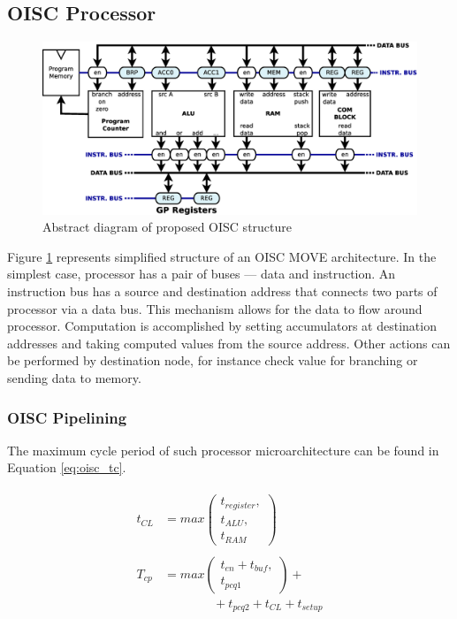 \subsection{OISC Processor}

\begin{figure}[t!]
	\centering
	\includegraphics[width=\linewidth]{../resources/oisc.eps}
	\caption{Abstract diagram of proposed OISC structure}
	\label{fig:oisc_simple}
\end{figure}

Figure \ref{fig:oisc_simple} represents simplified structure of an OISC MOVE architecture. In the simplest case, processor has a pair of buses — data and instruction. An instruction bus has a source and destination address that connects two parts of processor via a data bus. This mechanism allows for the data to flow around processor. Computation is accomplished by setting accumulators at destination addresses and taking computed values from the source address. Other actions can be performed by destination node, for instance check value for branching or sending data to memory. 

\subsubsection{OISC Pipelining}
The maximum cycle period of such processor microarchitecture can be found in Equation \ref{eq:oisc_tc}. 

\begin{multline}\label{eq:oisc_tc}
	\begin{split}
t_{CL} &= max \left( \begin{matrix}
t_{register},\\
t_{ALU},\\
t_{RAM}\end{matrix}\right)\\
&\\
T_{cp} &= max \left( \begin{matrix}
t_{en} + t_{buf},\\
t_{pcq1}\end{matrix}\right) +\\
&\qquad\qquad+ t_{pcq2} + t_{CL} + t_{setup}
	\end{split}
\end{multline}


